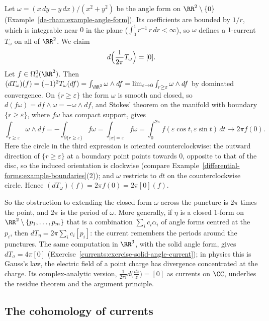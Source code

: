 \begin{example}\label{currents:example-angle-current}
Let $\omega = (x\,dy - y\,dx)/(x^2 + y^2)$ be the angle form on $\RR^2 \setminus \{0\}$ (Example~\ref{de-rham:example-angle-form}). Its coefficients are bounded by $1/r$, which is integrable near $0$
in the plane ($\int_0^1r^{-1}\,r\,dr < \infty$), so $\omega$ defines a $1$-current $T_\omega$ on all of $\RR^2$. We claim
\[
d\Bigl(\frac{1}{2\pi}T_\omega\Bigr) = [0].
\]
Let $f \in \Omega^0_c(\RR^2)$. Then $(dT_\omega)(f) = (-1)^2T_\omega(df) = \int_{\RR^2}\omega \wedge df = \lim_{\varepsilon \to 0}\int_{r \geq \varepsilon}\omega \wedge df$ by dominated convergence. On
$\{r \geq \varepsilon\}$ the form $\omega$ is smooth and closed, so $d(f\omega) = df \wedge \omega = -\omega \wedge df$, and Stokes' theorem on the manifold with boundary $\{r \geq \varepsilon\}$, where $f\omega$ has
compact support, gives
\[
\int_{r \geq \varepsilon}\omega \wedge df = -\int_{\partial\{r \geq \varepsilon\}}f\omega = \int_{|x| = \varepsilon}f\omega = \int_0^{2\pi}f(\varepsilon\cos t, \varepsilon\sin t)\,dt \longrightarrow 2\pi f(0).
\]
Here the circle in the third expression is oriented counterclockwise: the outward direction of $\{r \geq \varepsilon\}$ at a boundary point points towards $0$, opposite to that of the disc, so
the induced orientation is clockwise (compare Example~\ref{differential-forms:example-boundaries}(2)); and $\omega$ restricts to $dt$ on the counterclockwise circle. Hence
$(dT_\omega)(f) = 2\pi f(0) = 2\pi[0](f)$.
\end{example}

So the obstruction to extending the closed form $\omega$ across the puncture is $2\pi$ times the point, and $2\pi$ is the period of $\omega$. More generally, if $\eta$ is a closed $1$-form on
$\RR^2 \setminus \{p_1, \ldots, p_m\}$ that is a combination $\sum_ic_i\alpha_i$ of angle forms centred at the $p_i$, then $d T_\eta = 2\pi\sum_ic_i[p_i]$: the current remembers the periods around the
punctures. The same computation in $\RR^3$, with the solid angle form, gives $d T_\sigma = 4\pi[0]$ (Exercise~\ref{currents:exercise-solid-angle-current}); in physics this is Gauss's law, the electric
field of a point charge has divergence concentrated at the charge. Its complex-analytic version, $\frac{1}{2\pi i}d\bigl(\frac{dz}{z}\bigr) = [0]$ as currents on $\CC$, underlies the residue theorem and the
argument principle.

\subsection{The cohomology of currents}\label{currents:subsection-currents-cohomology}

